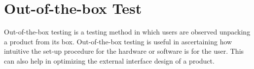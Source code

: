\chapter{Out-of-the-box Test}
Out-of-the-box testing is a testing method in which users are observed unpacking a product from its box. Out-of-the-box testing is useful in ascertaining how intuitive the set-up procedure for the hardware or software is for the user. This can also help in optimizing the external interface design of a product.